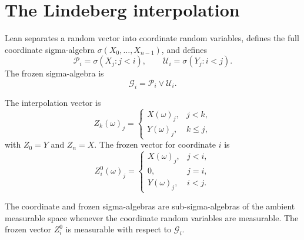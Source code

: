 \section{The Lindeberg interpolation}

\begin{definition}\label{def:sigma-algebras}
\leanok
Lean separates a random vector into coordinate random variables, defines the
full coordinate sigma-algebra \(\sigma(X_0,\ldots,X_{n-1})\), and defines
\[
  \mathcal P_i=\sigma(X_j:j<i),\qquad
  \mathcal U_i=\sigma(Y_j:i<j).
\]
The frozen sigma-algebra is
\[
  \mathcal G_i=\mathcal P_i\vee\mathcal U_i .
\]
\end{definition}

\begin{definition}\label{def:interpolation}
\leanok
The interpolation vector is
\[
  Z_k(\omega)_j=
  \begin{cases}
    X(\omega)_j, & j<k,\\
    Y(\omega)_j, & k\le j,
  \end{cases}
\]
with \(Z_0=Y\) and \(Z_n=X\).  The frozen vector for coordinate \(i\) is
\[
  Z_i^0(\omega)_j=
  \begin{cases}
    X(\omega)_j, & j<i,\\
    0, & j=i,\\
    Y(\omega)_j, & i<j.
  \end{cases}
\]
\end{definition}

\begin{lemma}\label{lem:interpolation-measurable}
\leanok
The coordinate and frozen sigma-algebras are sub-sigma-algebras of the ambient
measurable space whenever the coordinate random variables are measurable.  The
frozen vector \(Z_i^0\) is measurable with respect to \(\mathcal G_i\).
\end{lemma}

